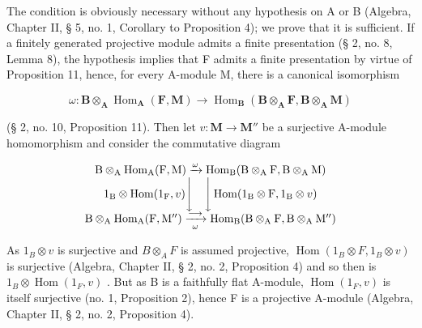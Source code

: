 The condition is obviously necessary without any hypothesis on A or B (Algebra, Chapter II, § 5, no. 1, Corollary to Proposition 4); we prove that it is sufficient. If a finitely generated projective module admits a finite presentation (§ 2, no. 8, Lemma 8), the hypothesis implies that F admits a finite presentation by virtue of Proposition 11, hence, for every A-module M, there is a canonical isomorphism

\[
\omega : \mathbf {B} \otimes_ {\mathbf {A}} \operatorname{Hom} _ {\mathbf {A}} (\mathbf {F}, \mathbf {M}) \rightarrow \operatorname{Hom} _ {\mathbf {B}} (\mathbf {B} \otimes_ {\mathbf {A}} \mathbf {F}, \mathbf {B} \otimes_ {\mathbf {A}} \mathbf {M})
\]

(§ 2, no. 10, Proposition 11). Then let \(v: \mathbf{M} \to \mathbf{M}''\) be a surjective A-module homomorphism and consider the commutative diagram

\[
\begin{array}{c} \mathrm{B} \otimes_ {\mathrm{A}} \operatorname{Hom} _ {\mathrm{A}} (\mathrm{F}, \mathrm{M}) \xrightarrow {\omega} \operatorname{Hom} _ {\mathrm{B}} (\mathrm{B} \otimes_ {\mathrm{A}} \mathrm{F}, \mathrm{B} \otimes_ {\mathrm{A}} \mathrm{M}) \\ 1 _ {\mathrm{B}} \otimes \operatorname{Hom} (1 _ {\mathrm{F}}, v) \Bigg \downarrow \quad \Bigg \downarrow \operatorname{Hom} (1 _ {\mathrm{B}} \otimes \mathrm{F}, 1 _ {\mathrm{B}} \otimes v) \\ \mathrm{B} \otimes_ {\mathrm{A}} \operatorname{Hom} _ {\mathrm{A}} (\mathrm{F}, \mathrm{M} ^ {\prime \prime}) \xrightarrow [ \omega ]{\longrightarrow} \operatorname{Hom} _ {\mathrm{B}} (\mathrm{B} \otimes_ {\mathrm{A}} \mathrm{F}, \mathrm{B} \otimes_ {\mathrm{A}} \mathrm{M} ^ {\prime \prime}) \end{array}
\]

As \(1_{B} \otimes v\) is surjective and \(B \otimes_{A} F\) is assumed projective, \(\operatorname{Hom}(1_{B} \otimes F, 1_{B} \otimes v)\) is surjective (Algebra, Chapter II, § 2, no. 2, Proposition 4) and so then is \(1_{B} \otimes \operatorname{Hom}(1_{F}, v)\) . But as B is a faithfully flat A-module, \(\operatorname{Hom}(1_{F}, v)\) is itself surjective (no. 1, Proposition 2), hence F is a projective A-module (Algebra, Chapter II, § 2, no. 2, Proposition 4).

